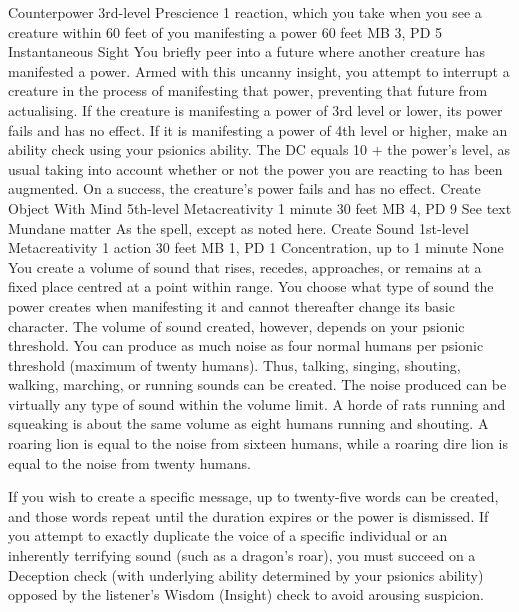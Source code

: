 \DndPowerHeader%
    {Counterpower\label{pwr:counterpower}}
    {3rd-level Prescience}
    {1 reaction, which you take when you see a creature
within 60 feet of you manifesting a power
}
    {60 feet}
    {MB 3, PD 5}
    {Instantaneous}
    {Sight}
You briefly peer into a future where another creature
has manifested a power. Armed with this uncanny insight,
you attempt to interrupt a creature in the process of
manifesting that power, preventing that future from actualising.
If the creature is manifesting a power
of 3rd level or lower, its power fails and has no effect.
If it is manifesting a power of 4th level or higher,
make an ability check using your psionics ability.
The DC equals 10 + the power's level, as usual taking into account
whether or not the power you are reacting to has been augmented.
On a success, the creature's power fails and has no effect.
\DndPowerHeader%
    {Create Object With Mind\label{pwr:create_object_with_mind}}
    {5th-level Metacreativity}
    {1 minute}
    {30 feet}
    {MB 4, PD 9}
    {See text}
    {Mundane matter}
As the  spell, except as
noted here.
\DndPowerHeader%
    {Create Sound\label{pwr:create_sound}}
    {1st-level Metacreativity}
    {1 action}
    {30 feet}
    {MB 1, PD 1}
    {Concentration, up to 1 minute}
    {None}
You create a volume of sound that rises,
recedes, approaches, or remains at a fixed place centred at
a point within range. You choose what type of sound the power
creates when manifesting it and cannot thereafter change its
basic character. The volume of sound created, however, depends
on your psionic threshold. You can produce as much noise as
four normal humans per psionic threshold (maximum of twenty humans).
Thus, talking, singing, shouting, walking, marching, or running
sounds can be created. The noise produced can be virtually
any type of sound within the volume limit. A horde of rats
running and squeaking is about the same volume as eight humans
running and shouting. A roaring lion is equal to the noise
from sixteen humans, while a roaring dire lion is equal to
the noise from twenty humans.

If you wish to create a specific message, up to twenty-five
words can be created, and those words repeat
until the duration expires or the power is dismissed. If you
attempt to exactly duplicate the voice of a specific individual
or an inherently terrifying sound (such as a dragon's roar),
you must succeed on a Deception check
(with underlying ability determined by your psionics ability)
opposed by the listener's
Wisdom (Insight) check to avoid arousing suspicion.

